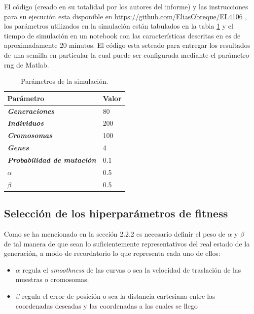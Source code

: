 \documentclass[12pt]{article}
\begin{document}
El código (creado en su totalidad por los autores del informe) y las instrucciones para su ejecución esta disponible en  \url{https://github.com/EliasObreque/EL4106} \cite{GIT}, los parámetros utilizados en la simulación están tabulados en la tabla \ref{parametros} y el tiempo de simulación en un notebook con las características descritas en \cite{gp62} es de aproximadamente 20 minutos. El código esta seteado para entregar los resultados de una semilla en particular la cual puede ser configurada mediante el parámetro rng de Matlab.


\begin{table}[]
\centering
\caption{Parámetros de la simulación.}
\begin{tabular}{|l|l|}
\hline
\textbf{Parámetro} & \textbf{Valor} \\ \hline
\textit{\textbf{Generaciones}} & 80 \\ \hline
\textit{\textbf{Individuos}} & 200 \\ \hline
\textit{\textbf{Cromosomas}} & 100 \\ \hline
\textit{\textbf{Genes}} & 4 \\ \hline
\textit{\textbf{Probabilidad de mutación}} & 0.1 \\ \hline
\textit{\textbf{$\alpha$}} & 0.5 \\ \hline
\textit{\textbf{$\beta$}} & 0.5 \\ \hline
\end{tabular}
\label{parametros}
\end{table}


\subsection{Selección de los hiperparámetros de fitness}

Como se ha mencionado en la sección 2.2.2 es necesario definir el peso de $\alpha$ y $\beta$ de tal manera de que sean lo suficientemente representativos del real estado de la generación, a modo de recordatorio lo que representa cada uno de ellos:

\begin{itemize}
    \item $\alpha$ regula el \textit{smoothness} de las curvas o sea la velocidad de traslación de las muestras o cromosomas.
  \item $\beta$ regula el error de posición o sea la distancia cartesiana entre las coordenadas deseadas y las coordenadas a las cuales se llego
\end{itemize}
\end{document}
